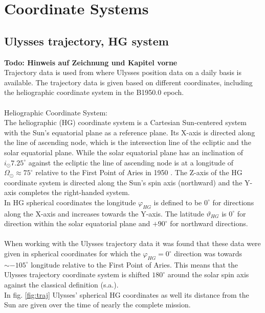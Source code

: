\section{Coordinate Systems}
%
\subsection{Ulysses trajectory, HG system}
\textbf{Todo: Hinweis auf Zeichnung und Kapitel vorne}\\
Trajectory data is used from \citet{ulysses-data-archive} where Ulysses position data on a daily basis is available. The trajectory data is given based on different coordinates, including the heliographic coordinate system in the B1950.0 epoch.
\\ \\
Heliographic Coordinate System:\\
The heliographic (HG) coordinate system is a Cartesian Sun-centered system with the Sun's equatorial plane as a reference plane. Its X-axis is directed along the line of ascending node, which is the intersection line of the ecliptic and the solar equatorial plane. While the solar equatorial plane has an inclination of $i_\odot 7.25 ^\circ$ against the ecliptic \citep{fraenz_harper} the line of ascending node is at a longitude of $\Omega_\odot \approx 75^\circ$ relative to the First Point of Aries in 1950 \citep{nasa-earth-coord}. The Z-axis of the HG coordinate system is directed along the Sun's spin axis (northward) and the Y-axis completes the right-handed system. \\
In HG spherical coordinates the longitude $\varphi_{HG}$ is defined to be $0^\circ$ for directions along the X-axis and increases towards the Y-axis. The latitude $\vartheta_{HG}$ is $0^\circ$ for direction within the solar equatorial plane and $+90^\circ$ for northward directions.\\ \\
%
%
When working with the Ulysses trajectory data it was found that these data were given in spherical coordinates for which the $\varphi_{HG} = 0^\circ$ direction was towards $\sim -105 ^\circ$ longitude relative to the First Point of Aries. This means that the Ulysses trajectory coordinate system is shifted $180^\circ$ around the solar spin axis against the classical definition (s.a.).\\
In fig. \ref{fig:traj} Ulysses' spherical HG coordinates as well its distance from the Sun are given over the time of nearly the complete mission.


